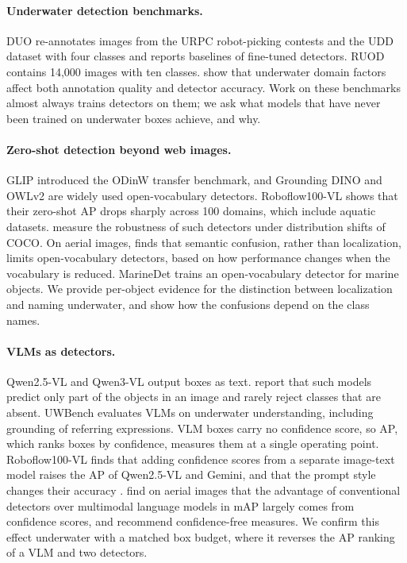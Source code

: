 \documentclass[letterpaper]{article} %
\begin{document}
\paragraph{Underwater detection benchmarks.}
DUO \citep{liu2021duo} re-annotates images from the URPC robot-picking contests and the UDD dataset \citep{liu2022udd} with four classes and reports baselines of fine-tuned detectors. RUOD \citep{fu2023ruod} contains 14,000 images with ten classes. \citet{wille2026domain} show that underwater domain factors affect both annotation quality and detector accuracy. Work on these benchmarks almost always trains detectors on them; we ask what models that have never been trained on underwater boxes achieve, and why.

\paragraph{Zero-shot detection beyond web images.}
GLIP \citep{li2022glip} introduced the ODinW transfer benchmark, and Grounding DINO \citep{liu2024grounding} and OWLv2 \citep{minderer2023scaling} are widely used open-vocabulary detectors. Roboflow100-VL \citep{robicheaux2025rf100vl} shows that their zero-shot AP drops sharply across 100 domains, which include aquatic datasets. \citet{chhipa2024robustness} measure the robustness of such detectors under distribution shifts of COCO. On aerial images, \citet{tsourveloudis2026aerial} finds that semantic confusion, rather than localization, limits open-vocabulary detectors, based on how performance changes when the vocabulary is reduced. MarineDet \citep{liang2023marinedet} trains an open-vocabulary detector for marine objects. We provide per-object evidence for the distinction between localization and naming underwater, and show how the confusions depend on the class names.

\paragraph{VLMs as detectors.}
Qwen2.5-VL \citep{bai2025qwen25vl} and Qwen3-VL \citep{bai2025qwen3vl} output boxes as text. \citet{fu2026wedetect} report that such models predict only part of the objects in an image and rarely reject classes that are absent. UWBench \citep{zhang2025uwbench} evaluates VLMs on underwater understanding, including grounding of referring expressions. VLM boxes carry no confidence score, so AP, which ranks boxes by confidence, measures them at a single operating point. Roboflow100-VL finds that adding confidence scores from a separate image-text model raises the AP of Qwen2.5-VL and Gemini, and that the prompt style changes their accuracy \citep{robicheaux2025rf100vl}. \citet{li2025aerialmlm} find on aerial images that the advantage of conventional detectors over multimodal language models in mAP largely comes from confidence scores, and recommend confidence-free measures. We confirm this effect underwater with a matched box budget, where it reverses the AP ranking of a VLM and two detectors.
\end{document}
